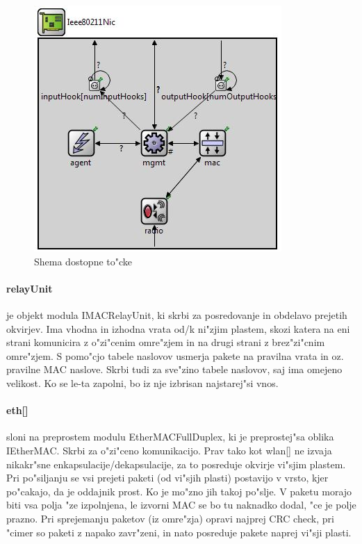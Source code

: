 \documentclass[a4paper,11pt]{article}
\begin{document}
\begin{figure}[htbp]
    \begin{center}
        \includegraphics[scale=0.8]{img/radio.jpg}
        \caption{Shema dostopne to"cke}
	\label{image:shema80211nic}
    \end{center}
\end{figure}


\paragraph{relayUnit}
\label{description:relayunit}

je objekt modula IMACRelayUnit, ki skrbi za posredovanje in obdelavo prejetih okvirjev. Ima vhodna in izhodna vrata od/k ni"zjim plastem, skozi katera na eni strani komunicira z o"zi"cenim omre"zjem in na drugi strani z brez"zi"cnim omre"zjem. S pomo"cjo tabele naslovov usmerja pakete na pravilna vrata in oz. pravilne MAC naslove. Skrbi tudi za sve"zino tabele naslovov, saj ima omejeno velikost. Ko se le-ta zapolni, bo iz nje izbrisan najstarej"si vnos.

\paragraph{eth[]}
\label{description:eth}

sloni na preprostem modulu EtherMACFullDuplex, ki je preprostej"sa oblika IEtherMAC. Skrbi za o"zi"ceno komunikacijo. Prav tako kot wlan[] ne izvaja nikakr"sne enkapsulacije/dekapsulacije, za to posreduje okvirje vi"sjim plastem. Pri po"siljanju se vsi prejeti paketi (od vi"sjih plasti) postavijo v vrsto, kjer po"cakajo, da je oddajnik prost. Ko je mo"zno jih takoj po"slje. V paketu morajo biti vsa polja "ze izpolnjena, le izvorni MAC se bo tu naknadko dodal, "ce je polje prazno. Pri sprejemanju paketov (iz omre"zja) opravi najprej CRC check, pri "cimer so paketi z napako zavr"zeni, in nato posreduje pakete naprej vi"sji plasti.
\end{document}
